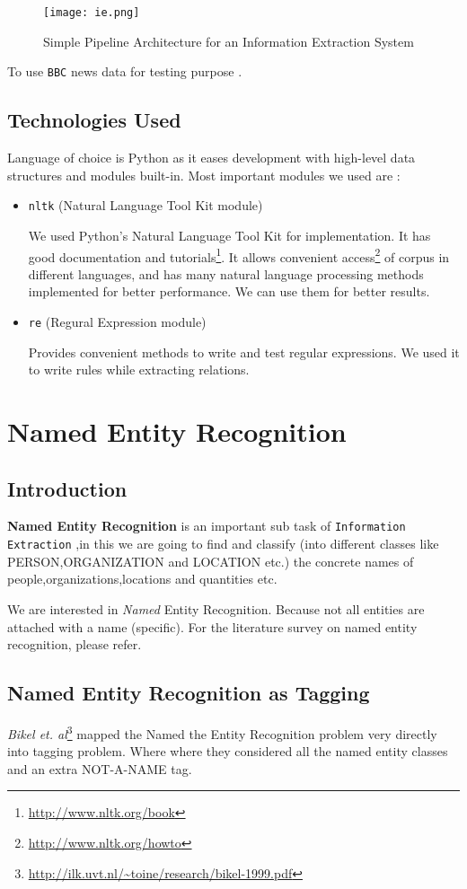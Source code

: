 \documentclass[12pt]{report}
\begin{document}
\begin{figure}[h]
\centering
\texttt{[image: ie.png]}
\caption{Simple Pipeline Architecture for an Information Extraction System\cite{BookIE}}
\label{IE}
\end{figure}
To use \texttt{BBC} news data for testing purpose .
\section{Technologies Used}
Language of choice is Python as it eases development with high-level data structures and modules built-in. Most important modules we used are :
\begin{itemize}
\item \texttt{nltk} (Natural Language Tool Kit module)
\par We used Python's  Natural Language Tool Kit for implementation. It has good documentation and tutorials\footnote{\url{http://www.nltk.org/book}}.
It allows convenient access\footnote{\url{http://www.nltk.org/howto}} of corpus in different languages, and has many natural language processing
 methods implemented for better performance. We can use them for better results.
\item \texttt{re} (Regural Expression module)
\par Provides convenient methods to write and test regular expressions. We used it to write rules while extracting relations.
\end{itemize}
\chapter{Named Entity Recognition}
\section{Introduction}
\par \textbf{Named Entity Recognition} is an important sub task of \texttt{Information Extraction} 
,in this we are going to find and classify (into different classes like PERSON,ORGANIZATION and LOCATION etc.) 
 the concrete names of people,organizations,locations and quantities etc.
\par We are interested in \textit{Named} Entity Recognition. Because not all entities are 
attached with a name (specific).
For the literature survey on named entity recognition, please refer\cite{Rahul}.
\section{Named Entity Recognition as Tagging}
\par \textit{Bikel et. al}\footnote{\url{http://ilk.uvt.nl/~toine/research/bikel-1999.pdf}} mapped the  Named the Entity Recognition problem very directly into tagging problem. Where
where they considered all the named entity classes and an extra NOT-A-NAME tag. 
\end{document}
